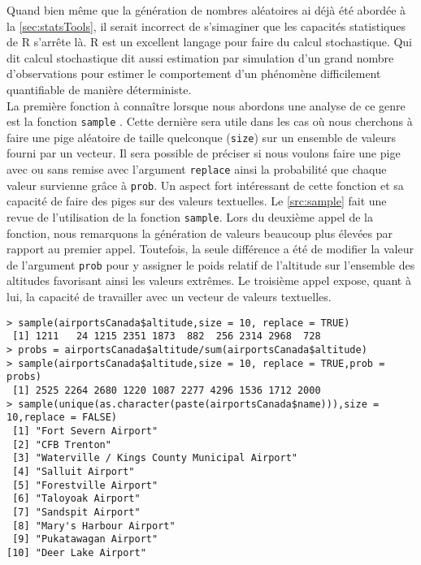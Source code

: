 Quand bien même que la génération de nombres aléatoires ai déjà été abordée à la \autoref{sec:statsTools}, il serait incorrect de s'simaginer que les capacités statistiques de R s'arrête là. R est un excellent langage pour faire du calcul stochastique. Qui dit calcul stochastique dit aussi estimation par simulation d'un grand nombre d'observations pour estimer le comportement d'un phénomène difficilement quantifiable de manière déterministe. \\

La première fonction à connaître lorsque nous abordons une analyse de ce genre est la fonction \texttt{sample} \cite{Rfunction:sample}. Cette dernière sera utile dans les cas où nous cherchons à faire une pige aléatoire de taille quelconque (\texttt{size}) sur un ensemble de valeurs fourni par un vecteur. Il sera possible de préciser si nous voulons faire une pige avec ou sans remise avec l'argument \texttt{replace} ainsi la probabilité que chaque valeur survienne grâce à \texttt{prob}. Un aspect fort intéressant de cette fonction et sa capacité de faire des piges sur des valeurs textuelles. Le \autoref{src:sample} fait une revue de l'utilisation de la fonction \texttt{sample}. Lors du deuxième appel de la fonction, nous remarquons la génération de valeurs beaucoup plus élevées par rapport au premier appel. Toutefois, la seule différence a été de modifier la valeur de l'argument \texttt{prob} pour y assigner le poids relatif de l'altitude sur l'ensemble des altitudes favorisant ainsi les valeurs extrêmes. Le troisième appel expose, quant à lui, la capacité de travailler avec un vecteur de valeurs textuelles. \\

\begin{lstlisting}[caption = Pige aléatoire sur support vectoriel,label=src:sample]
> sample(airportsCanada$altitude,size = 10, replace = TRUE)
 [1] 1211   24 1215 2351 1873  882  256 2314 2968  728
> probs = airportsCanada$altitude/sum(airportsCanada$altitude)
> sample(airportsCanada$altitude,size = 10, replace = TRUE,prob = probs)
 [1] 2525 2264 2680 1220 1087 2277 4296 1536 1712 2000
> sample(unique(as.character(paste(airportsCanada$name))),size = 10,replace = FALSE)
 [1] "Fort Severn Airport"                        
 [2] "CFB Trenton"                                
 [3] "Waterville / Kings County Municipal Airport"
 [4] "Salluit Airport"                            
 [5] "Forestville Airport"                        
 [6] "Taloyoak Airport"                           
 [7] "Sandspit Airport"                           
 [8] "Mary's Harbour Airport"                     
 [9] "Pukatawagan Airport"                        
[10] "Deer Lake Airport"
\end{lstlisting}

